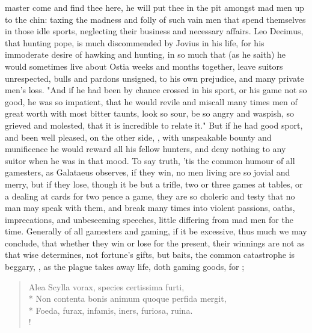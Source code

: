 master come and find thee here, he will put thee in the pit amongst mad men up
to the chin: taxing the madness and folly of such vain men that spend
themselves in those idle sports, neglecting their business and necessary
affairs. Leo Decimus, that hunting pope, is much discommended by
Jovius in his life, for his immoderate desire of hawking
and hunting, in so much that (as he saith) he would sometimes live about Ostia
weeks and months together, leave suitors unrespected,
bulls and pardons unsigned, to his own prejudice, and many private men's loss.
"And if he had been by chance crossed in his sport, or his
game not so good, he was so impatient, that he would revile and miscall many
times men of great worth with most bitter taunts, look so sour, be so angry and
waspish, so grieved and molested, that it is incredible to relate it." But if
he had good sport, and been well pleased, on the other side, , with unspeakable bounty and munificence he would reward all his
fellow hunters, and deny nothing to any suitor when he was in that mood. To say
truth, 'tis the common humour of all gamesters, as Galataeus observes, if they
win, no men living are so jovial and merry, but if they
lose, though it be but a trifle, two or three games at tables, or a dealing at
cards for two pence a game, they are so choleric and testy that no man may
speak with them, and break many times into violent passions, oaths,
imprecations, and unbeseeming speeches, little differing from mad men for the
time. Generally of all gamesters and gaming, if it be excessive, thus much we
may conclude, that whether they win or lose for the present, their winnings are
not  as that wise \Seneca{} determines, not
fortune's gifts, but baits, the common catastrophe is
beggary, , as the plague takes away life, doth gaming goods, for
;

\begin{latin}
\begin{verse}%
Alea Scylla vorax, species certissima furti,\\*
Non contenta bonis animum quoque perfida mergit,\\*
Foeda, furax, infamis, iners, furiosa, ruina.\\!
\end{verse}%
\end{latin}

